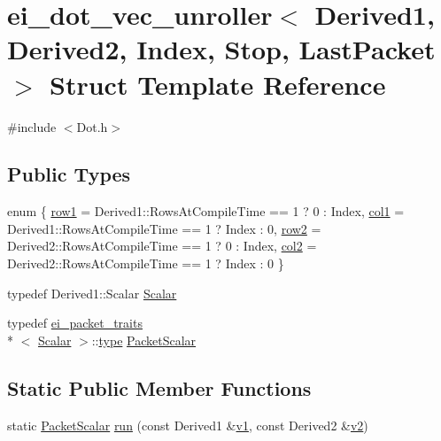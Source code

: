 \hypertarget{structei__dot__vec__unroller}{\section{ei\-\_\-dot\-\_\-vec\-\_\-unroller$<$ Derived1, Derived2, Index, Stop, Last\-Packet $>$ Struct Template Reference}
\label{structei__dot__vec__unroller}
}


{\ttfamily \#include $<$Dot.\-h$>$}

\subsection*{Public Types}
\begin{DoxyCompactItemize}
\item 
enum \{ \hyperlink{structei__dot__vec__unroller_aaafdf3f147f4d4163af4521a82f981e7a22a7ad1619b5cee14c5f6a8ed95bcbec}{row1} = Derived1\-:\-:Rows\-At\-Compile\-Time == 1 ? 0 \-: Index, 
\hyperlink{structei__dot__vec__unroller_aaafdf3f147f4d4163af4521a82f981e7a2e8ebbee1df2a9e476ebfb9ee5598570}{col1} = Derived1\-:\-:Rows\-At\-Compile\-Time == 1 ? Index \-: 0, 
\hyperlink{structei__dot__vec__unroller_aaafdf3f147f4d4163af4521a82f981e7a8a8ce04d673a04dcaf619aa5a7e1e98c}{row2} = Derived2\-:\-:Rows\-At\-Compile\-Time == 1 ? 0 \-: Index, 
\hyperlink{structei__dot__vec__unroller_aaafdf3f147f4d4163af4521a82f981e7a7b2daae91e1882c6a6771bd1ce7ac189}{col2} = Derived2\-:\-:Rows\-At\-Compile\-Time == 1 ? Index \-: 0
 \}
\item 
typedef Derived1\-::\-Scalar \hyperlink{structei__dot__vec__unroller_a8f9b3bdfd158f2fc14ce4e2bd08b0495}{Scalar}
\item 
typedef \hyperlink{structei__packet__traits}{ei\-\_\-packet\-\_\-traits}\\*
$<$ \hyperlink{structei__dot__vec__unroller_a8f9b3bdfd158f2fc14ce4e2bd08b0495}{Scalar} $>$\-::\hyperlink{glext_8h_a7d05960f4f1c1b11f3177dc963a45d86}{type} \hyperlink{structei__dot__vec__unroller_aedb0c88f724b3bb8dd27f66f649d29c8}{Packet\-Scalar}
\end{DoxyCompactItemize}
\subsection*{Static Public Member Functions}
\begin{DoxyCompactItemize}
\item 
static \hyperlink{structei__dot__vec__unroller_aedb0c88f724b3bb8dd27f66f649d29c8}{Packet\-Scalar} \hyperlink{structei__dot__vec__unroller_aaee2d3f99e1567d29972bbba179882a1}{run} (const Derived1 \&\hyperlink{glext_8h_aabdd9aabede45fcf97cea04f88d2ad60}{v1}, const Derived2 \&\hyperlink{glext_8h_ae35401c8c2fcdcc48c20ba325ee473ea}{v2})
\end{DoxyCompactItemize}


